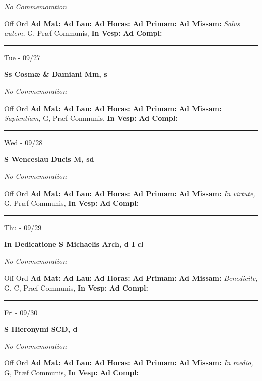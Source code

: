 \documentclass[letterpaper, 10pt]{article}
\begin{document}
\textit{No Commemoration}\begin{justify}
Off Ord
\textbf{Ad Mat: }
\textbf{Ad Lau: }
\textbf{Ad Horas: }
\textbf{Ad Primam: }
\textbf{Ad Missam:} \textit{Salus autem, } G, Præf Communis, 
\textbf{In Vesp: }
\textbf{Ad Compl: }\end{justify}



\hrule
\begin{center}
Tue - 09/27
\end{center}\textbf{ \large Ss Cosmæ \& Damiani Mm, \textnormal{\normalsize s}}

\textit{No Commemoration}\begin{justify}
Off Ord
\textbf{Ad Mat: }
\textbf{Ad Lau: }
\textbf{Ad Horas: }
\textbf{Ad Primam: }
\textbf{Ad Missam:} \textit{Sapientiam, } G, Præf Communis, 
\textbf{In Vesp: }
\textbf{Ad Compl: }\end{justify}



\hrule
\begin{center}
Wed - 09/28
\end{center}\textbf{ \large S Wenceslau Ducis M, \textnormal{\normalsize sd}}

\textit{No Commemoration}\begin{justify}
Off Ord
\textbf{Ad Mat: }
\textbf{Ad Lau: }
\textbf{Ad Horas: }
\textbf{Ad Primam: }
\textbf{Ad Missam:} \textit{In virtute, } G, Præf Communis, 
\textbf{In Vesp: }
\textbf{Ad Compl: }\end{justify}



\hrule
\begin{center}
Thu - 09/29
\end{center}\textbf{ \large In Dedicatione S Michaelis Arch, \textnormal{\normalsize d I cl}}

\textit{No Commemoration}\begin{justify}
Off Ord
\textbf{Ad Mat: }
\textbf{Ad Lau: }
\textbf{Ad Horas: }
\textbf{Ad Primam: }
\textbf{Ad Missam:} \textit{Benedicite, } G, C, Præf Communis, 
\textbf{In Vesp: }
\textbf{Ad Compl: }\end{justify}



\hrule
\begin{center}
Fri - 09/30
\end{center}\textbf{ \large S Hieronymi SCD, \textnormal{\normalsize d}}

\textit{No Commemoration}\begin{justify}
Off Ord
\textbf{Ad Mat: }
\textbf{Ad Lau: }
\textbf{Ad Horas: }
\textbf{Ad Primam: }
\textbf{Ad Missam:} \textit{In medio, } G, Præf Communis, 
\textbf{In Vesp: }
\textbf{Ad Compl: }\end{justify}
\end{document}
